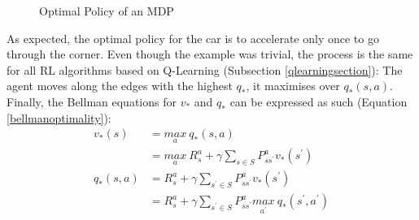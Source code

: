\begin{figure}[H]
\caption{Optimal Policy of an MDP}
\label{optimalpolicymdp}
\end{figure}
 
As expected, the optimal policy for the car is to accelerate only once to go through the corner. Even though the example was trivial, the process is the same for all RL algorithms based on Q-Learning (Subsection \ref{qlearningsection}): The agent moves along the edges with the highest $q_*$, it maximises over $q_*(s,a)$.
\newline
Finally, the Bellman equations for $v_*$ and $q_*$ can be expressed as such (Equation \ref{bellmanoptimality}):
\begin{equation}
\label{bellmanoptimality}
	\begin{split}
		v_*(s) & = \underset{a}{max} \: q_*(s,a) \\
		& = \underset{a}{max} \: R_{s}^{a} + \gamma \sum\limits_{s \in S}P_{ss^{'}}^{a} v_*(s^{'}) \\
		q_*(s,a) & = R_{s}^{a} + \gamma \sum\limits_{s^{'} \in S} P_{ss^{'}}^{a} v_*(s^{'}) \\
		& = R_{s}^{a}+\gamma \sum\limits_{s^{'} \in S}P_{ss^{'}}^{a}\underset{a^{'}}{max} \: q_*(s^{'},a^{'})
	\end{split}
\end{equation}

